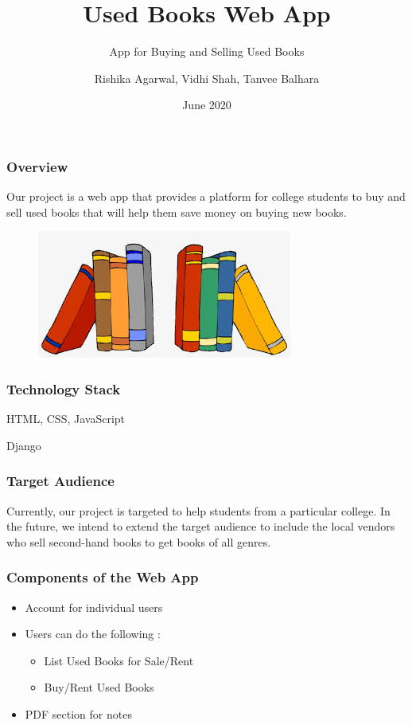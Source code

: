 \documentclass[14pt]{beamer}
\title[USED BOOKS]{Used Books Web App}
\subtitle{App for Buying and Selling Used Books}
\author[Team 14]{Rishika Agarwal, Vidhi Shah, Tanvee Balhara}
\date{June 2020}
\begin{document}
\begin{frame}
    \titlepage
\end{frame}

\begin{frame}
    \frametitle{Overview}
    Our project is a web app that provides a platform for college students to buy and sell used books that will help them save money on buying new books.
    \begin{figure}
        \includegraphics[scale=0.5]{books.jpg}
        \end{figure}
    \end{frame}

\begin{frame}
    \frametitle{Technology Stack}
    \begin{description}
        \item<1-> [Front-end:] HTML, CSS, JavaScript
        \item<2-> [Back-end:] Django
    \end{description}
\end{frame}

\begin{frame}
    \frametitle{Target Audience}
    Currently, our project is targeted to help students from a particular college. In the future, we intend to extend the target audience to include the local vendors who sell second-hand books to get books of all genres.
\end{frame}

\begin{frame}
    \frametitle{Components of the Web App}
    \begin{itemize}
        \item<1->  Account for individual users
        \item<2->  Users can do the following :
            \begin{itemize}
                \item<3->  List Used Books for Sale/Rent
                \item<4->  Buy/Rent Used Books
            \end{itemize}
        \item<5->  PDF section for notes
    \end{itemize}
\end{frame}
\end{document}
